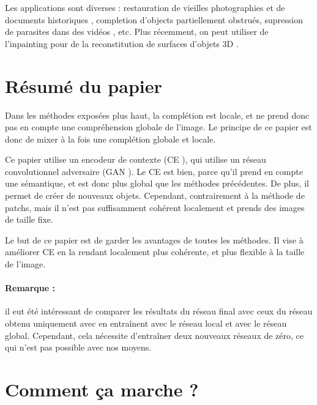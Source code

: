 \documentclass[12pt]{article}
\begin{document}
Les applications sont diverses : restauration de vieilles photographies et de documents historiques \cite{bertalmio2000}, completion d'objects partiellement obstrués, supression de parasites dans des vidéos \cite{wexler2007}, etc. Plus récemment, on peut utiliser de l'inpainting pour de la reconstitution de surfaces d'objets 3D \cite{bobenko2005} \cite{harary2014}.

\section{Résumé du papier}

Dans les méthodes exposées plus haut, la complétion est locale, et ne prend donc pas en compte une compréhension globale de l'image. Le principe de ce papier est donc de mixer à la fois une complétion globale et locale.

Ce papier utilise un encodeur de contexte (CE \cite{pathak2016}), qui utilise un réseau convolutionnel adversaire (GAN \cite{goodfellow2014}). Le CE est bien, parce qu'il prend en compte une sémantique, et est donc plus global que les méthodes précédentes. De plus, il permet de créer de nouveaux objets. Cependant, contrairement à la méthode de patchs, mais il n'est pas suffisamment cohérent localement et prends des images de taille fixe.

Le but de ce papier est de garder les avantages de toutes les méthodes. Il vise à améliorer CE en la rendant localement plus cohérente, et plus flexible à la taille de l'image.


\paragraph{Remarque :} il eut été intéressant de comparer les résultats du réseau final avec ceux du réseau obtenu uniquement avec en entraînent avec le réseau local et avec le réseau global. Cependant, cela nécessite d'entraîner deux nouveaux réseaux de zéro, ce qui n'est pas possible avec nos moyens.

\section{Comment ça marche ?}
\end{document}
